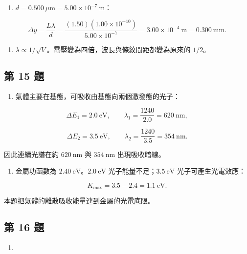 \documentclass[11pt,a4paper]{article}
\providecommand{\tightlist}{%
  \setlength{\itemsep}{0pt}\setlength{\parskip}{0pt}}
\begin{document}
\begin{enumerate}
\def\labelenumi{(\arabic{enumi})}
\setcounter{enumi}{1}
\tightlist
\item
  \(d=0.500\ \mu\mathrm m=5.00\times10^{-7}\ \mathrm m\)：
\end{enumerate}

\[
\Delta y=\frac{L\lambda}{d}
=\frac{(1.50)(1.00\times10^{-10})}{5.00\times10^{-7}}
=3.00\times10^{-4}\ \mathrm m
=0.300\ \mathrm{mm}.
\]

\begin{enumerate}
\def\labelenumi{(\arabic{enumi})}
\setcounter{enumi}{2}
\tightlist
\item
  \(\lambda\propto1/\sqrt V\)。電壓變為四倍，波長與條紋間距都變為原來的 \(1/2\)。
\end{enumerate}

\subsection{第 15 題}\label{ux7b2c-15-ux984c}

\begin{enumerate}
\def\labelenumi{(\arabic{enumi})}
\tightlist
\item
  氣體主要在基態，可吸收由基態向兩個激發態的光子：
\end{enumerate}

\[
\Delta E_1=2.0\ \mathrm{eV},
\qquad
\lambda_1=\frac{1240}{2.0}=620\ \mathrm{nm},
\]

\[
\Delta E_2=3.5\ \mathrm{eV},
\qquad
\lambda_2=\frac{1240}{3.5}=354\ \mathrm{nm}.
\]

因此連續光譜在約 \(620\ \mathrm{nm}\) 與 \(354\ \mathrm{nm}\) 出現吸收暗線。

\begin{enumerate}
\def\labelenumi{(\arabic{enumi})}
\setcounter{enumi}{1}
\tightlist
\item
  金屬功函數為 \(2.40\ \mathrm{eV}\)。\(2.0\ \mathrm{eV}\) 光子能量不足；\(3.5\ \mathrm{eV}\) 光子可產生光電效應：
\end{enumerate}

\[
K_{\max}=3.5-2.4=1.1\ \mathrm{eV}.
\]

本題把氣體的離散吸收能量連到金屬的光電底限。

\subsection{第 16 題}\label{ux7b2c-16-ux984c}

\begin{enumerate}
\def\labelenumi{(\arabic{enumi})}
\tightlist
\item
\end{enumerate}
\end{document}
